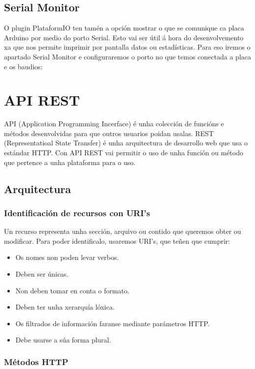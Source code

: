 \documentclass[11pt,twoside]{book}
\begin{document}
\subsection{Serial Monitor}

O plugin PlataformIO ten tamén a opción mostrar o que se comunique ca placa Arduino por medio do porto Serial.
Esto vai ser útil á hora do desenvolvemento xa que nos permite imprimir por pantalla datos ou estadísticas.
 Para eso iremos o apartado Serial Monitor e configuraremos o porto no que temos conectada a placa e os baudios:

\section{API REST}

API (Application Programming Incerface) é unha colección de funcións e métodos desenvolvidas para que outros usuarios poidan usalas. 
REST (Representatioal State Transfer) é unha arquitectura de desarrollo web que usa o estándar HTTP. 
Con API REST vai permitir o uso de unha función ou método que pertence a unha plataforma para o uso.

\subsection{Arquitectura}

\subsubsection{Identificación de recursos con URI's}

Un recurso representa unha sección, arquivo ou contido que queremos obter ou modificar. Para poder identificalo, usaremos URI's, que teñen que cumprir:
\begin{itemize}
    \item Os nomes non poden levar verbos.
    \item Deben ser únicas.
    \item Non deben tomar en conta o formato.
    \item Deben ter unha xerarquía lóxica.
    \item Os filtrados de información faranse mediante parámetros HTTP.
    \item Debe usarse a súa forma plural.
\end{itemize}

\subsubsection{Métodos HTTP}
\end{document}
